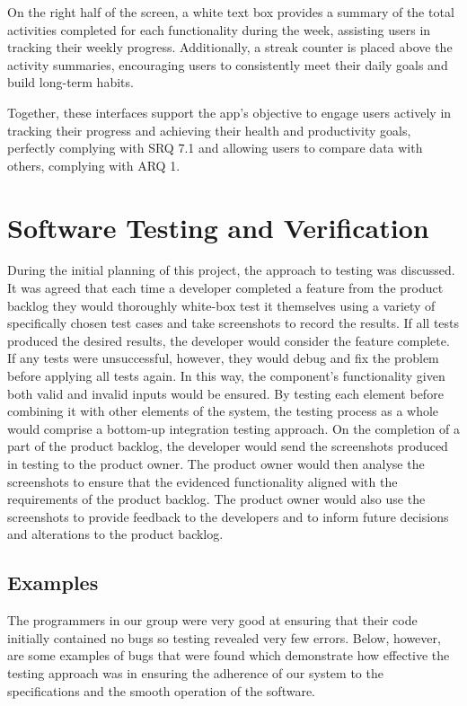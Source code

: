 \documentclass[12pt]{article}
\begin{document}
On the right half of the screen, a white text box provides a summary of the total activities
completed for each functionality during the week, assisting users in tracking their weekly
progress. Additionally, a streak counter is placed above the activity summaries, encouraging
users to consistently meet their daily goals and build long-term habits.\par

Together, these interfaces support the app’s objective to engage users actively in tracking
their progress and achieving their health and productivity goals, perfectly complying with SRQ 7.1 and allowing users to compare data with others, complying with ARQ 1.\par


\section{Software Testing and Verification} \label{sec:testing}

During the initial planning of this project, the approach to testing was
discussed. It was agreed that each time a developer completed a feature from the
product backlog they would thoroughly white-box test it themselves using a
variety of specifically chosen test cases and take screenshots to record the
results. If all tests produced the desired results, the developer would consider
the feature complete. If any tests were unsuccessful, however, they would debug
and fix the problem before applying all tests again. In this way, the component's
functionality given both valid and invalid inputs would be ensured. By testing
each element before combining it with other elements of the system, the testing
process as a whole would comprise a bottom-up integration testing approach. On
the completion of a part of the product backlog, the developer would send the
screenshots produced in testing to the product owner. The product owner would
then analyse the screenshots to ensure that the evidenced functionality aligned
with the requirements of the product backlog. The product owner would also use
the screenshots to provide feedback to the developers and to inform future
decisions and alterations to the product backlog.\par

\subsection{Examples}
The programmers in our group were very good at ensuring that their code initially 
contained no bugs so testing revealed very few errors. Below, however, are some 
examples of bugs that were found which demonstrate how effective the testing approach 
was in ensuring the adherence of our system to the specifications and the smooth 
operation of the software.\par
\end{document}
